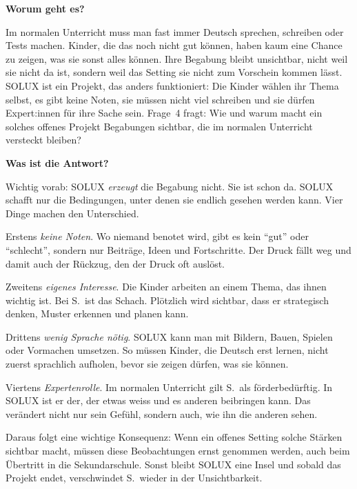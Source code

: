 \documentclass[ngerman, a4paper]{article}
\begin{document}
\begin{frageantwort4}
  \textbf{Worum geht es?}

  Im normalen Unterricht muss man fast immer Deutsch sprechen, schreiben
  oder Tests machen. Kinder, die das noch nicht gut können, haben kaum
  eine Chance zu zeigen, was sie sonst alles können. Ihre Begabung bleibt
  unsichtbar, nicht weil sie nicht da ist, sondern weil das Setting sie
  nicht zum Vorschein kommen lässt. SOLUX ist ein Projekt, das anders
  funktioniert: Die Kinder wählen ihr Thema selbst, es gibt keine Noten,
  sie müssen nicht viel schreiben und sie dürfen Expert:innen für ihre
  Sache sein. Frage~4 fragt: Wie und warum macht ein solches offenes
  Projekt Begabungen sichtbar, die im normalen Unterricht versteckt bleiben?

  \medskip
  \textbf{Was ist die Antwort?}

  Wichtig vorab: SOLUX \emph{erzeugt} die Begabung nicht. Sie ist schon
  da. SOLUX schafft nur die Bedingungen, unter denen sie endlich gesehen
  werden kann. Vier Dinge machen den Unterschied.

  Erstens \emph{keine Noten}. Wo niemand benotet wird, gibt es kein
  \enquote{gut} oder \enquote{schlecht}, sondern nur Beiträge, Ideen und
  Fortschritte. Der Druck fällt weg und damit auch der Rückzug, den der
  Druck oft auslöst.

  Zweitens \emph{eigenes Interesse}. Die Kinder arbeiten an einem Thema,
  das ihnen wichtig ist. Bei S.~ist das Schach. Plötzlich wird sichtbar,
  dass er strategisch denken, Muster erkennen und planen kann.

  Drittens \emph{wenig Sprache nötig}. SOLUX kann man mit Bildern, Bauen,
  Spielen oder Vormachen umsetzen. So müssen Kinder, die Deutsch erst
  lernen, nicht zuerst sprachlich aufholen, bevor sie zeigen dürfen, was
  sie können.

  Viertens \emph{Expertenrolle}. Im normalen Unterricht gilt S.~als
  förderbedürftig. In SOLUX ist er der, der etwas weiss und es anderen
  beibringen kann. Das verändert nicht nur sein Gefühl, sondern auch,
  wie ihn die anderen sehen.

  Daraus folgt eine wichtige Konsequenz: Wenn ein offenes Setting solche
  Stärken sichtbar macht, müssen diese Beobachtungen ernst genommen
  werden, auch beim Übertritt in die Sekundarschule. Sonst bleibt SOLUX
  eine Insel und sobald das Projekt endet, verschwindet S.~wieder in der
  Unsichtbarkeit.
\end{frageantwort4}
\end{document}
